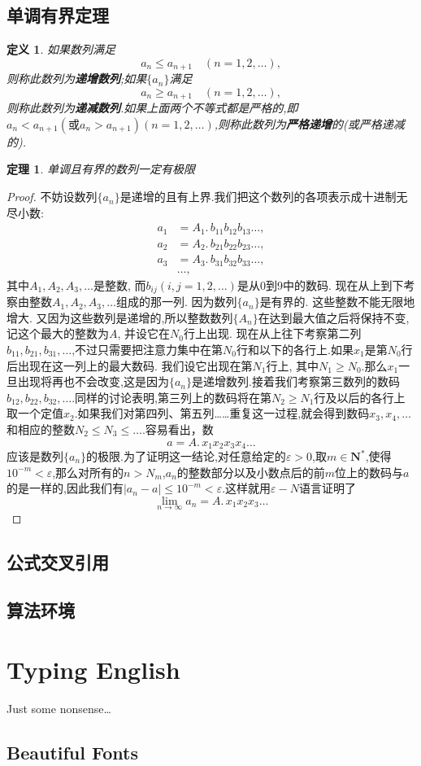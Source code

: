 \documentclass[UTF8,a4paper,twoside,zihao=-4]{ctexrep}
\theoremstyle{nonumberplain}
\newtheorem{proof}{证明}
\newtheorem{theorem}{定理}[chapter]
\newtheorem{definition}{定义}[chapter]
\newcommand{\nn}{\mathbf{N}^\ast}
\renewcommand{\leq}{\leqslant}
\renewcommand{\geq}{\geqslant}
\renewcommand{\epsilon}{\varepsilon}
\begin{document}
\section{单调有界定理}
\begin{definition}
如果数列满足
\[
a_n\leq a_{n+1}\quad(n=1,2,\dots),
\]
则称此数列为\textbf{递增数列};如果$\{a_n\}$满足
\[
a_n\geq a_{n+1}\quad(n=1,2,\dots),
\]
则称此数列为\textbf{递减数列}.如果上面两个不等式都是严格的,即$a_n<a_{n+1}(\mbox{或}a_n>a_{n+1})(n=1,2,\dots)$,则称此数列为\textbf{严格递增}的(或严格递减的).
\end{definition}
\begin{theorem}\label{T:DDYJ}
单调且有界的数列一定有极限
\end{theorem}
\begin{proof}
	不妨设数列$\{a_n\}$是递增的且有上界.我们把这个数列的各项表示成十进制无尽小数:
\[
\begin{aligned}
	a_1&=A_1.\,b_{11}b_{12}b_{13}\dots ,\\
	a_2&=A_2.\,b_{21}b_{22}b_{23}\dots ,\\
	a_3&=A_3.\,b_{31}b_{32}b_{33}\dots ,\\
	&\dots ,
\end{aligned}
\]
其中$A_1, A_2, A_3,\dots$是整数, 而$b_{ij}(i,j=1,2,\dots)$是从0到9中的数码. 现在从上到下考察由整数$A_1,A_2,A_3,\dots$组成的那一列. 因为数列$\{a_n\}$是有界的. 这些整数不能无限地增大. 又因为这些数列是递增的,所以整数数列$\{A_n\}$在达到最大值之后将保持不变, 记这个最大的整数为$A$, 并设它在$N_0$行上出现. 现在从上往下考察第二列$b_{11},b_{21},b_{31},\dots$,不过只需要把注意力集中在第$N_0$行和以下的各行上.如果$x_1$是第$N_0$行后出现在这一列上的最大数码. 我们设它出现在第$N_1$行上, 其中$N_1\geq N_0$.那么$x_1$一旦出现将再也不会改变,这是因为$\{a_n\}$是递增数列.接着我们考察第三数列的数码$b_{12},b_{22},b_{32},\dots$.同样的讨论表明,第三列上的数码将在第$N_2\geq N_1$行及以后的各行上取一个定值$x_2$.如果我们对第四列、第五列……重复这一过程,就会得到数码$x_3,x_4,\dots$和相应的整数$N_2\leq N_3\leq\dots$.容易看出，数
\[
a=A.\,x_1x_2x_3x_4\dots
\]
应该是数列$\{a_n\}$的极限.为了证明这一结论,对任意给定的$\epsilon>0$,取$m\in\nn$,使得$10^{-m}<\epsilon$,那么对所有的$n>N_m$,$a_n$的整数部分以及小数点后的前$m$位上的数码与$a$的是一样的,因此我们有$|a_n-a|\leq10^{-m}<\epsilon$.这样就用$\epsilon-N$语言证明了
\[
\lim_{n\to\infty}a_n=A.\,x_1x_2x_3\dots
\]
\end{proof}
\section{公式交叉引用}

\section{算法环境}

\chapter{Typing English}
Just some nonsense\dots
\section{Beautiful Fonts}
\lipsum


\end{document}
